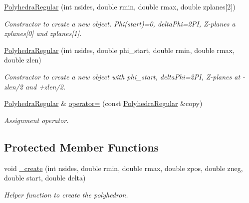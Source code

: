 \begin{DoxyCompactItemize}
\hyperlink{class_d_d4hep_1_1_geometry_1_1_polyhedra_regular_a0fd96974d56ca2fb51494fc69d9c0443}{PolyhedraRegular} (int nsides, double rmin, double rmax, double zplanes\mbox{[}2\mbox{]})
\begin{DoxyCompactList}\small\item\em Constructor to create a new object. Phi(start)=0, deltaPhi=2PI, Z-\/planes a zplanes\mbox{[}0\mbox{]} and zplanes\mbox{[}1\mbox{]}. \item\end{DoxyCompactList}\item 
\hyperlink{class_d_d4hep_1_1_geometry_1_1_polyhedra_regular_a753b26a4ca8dc57fe9f3d1396a9acb81}{PolyhedraRegular} (int nsides, double phi\_\-start, double rmin, double rmax, double zlen)
\begin{DoxyCompactList}\small\item\em Constructor to create a new object with phi\_\-start, deltaPhi=2PI, Z-\/planes at -\/zlen/2 and +zlen/2. \item\end{DoxyCompactList}\item 
\hyperlink{class_d_d4hep_1_1_geometry_1_1_polyhedra_regular}{PolyhedraRegular} \& \hyperlink{class_d_d4hep_1_1_geometry_1_1_polyhedra_regular_ab38a979b481a85b991b407cf30606b60}{operator=} (const \hyperlink{class_d_d4hep_1_1_geometry_1_1_polyhedra_regular}{PolyhedraRegular} \&copy)
\begin{DoxyCompactList}\small\item\em Assignment operator. \item\end{DoxyCompactList}\end{DoxyCompactItemize}
\subsection*{Protected Member Functions}
\begin{DoxyCompactItemize}
\item 
void \hyperlink{class_d_d4hep_1_1_geometry_1_1_polyhedra_regular_add1de904bca13df6b2b5e938e1afb7d8}{\_\-create} (int nsides, double rmin, double rmax, double zpos, double zneg, double start, double delta)
\begin{DoxyCompactList}\small\item\em Helper function to create the polyhedron. \item\end{DoxyCompactList}\end{DoxyCompactItemize}


